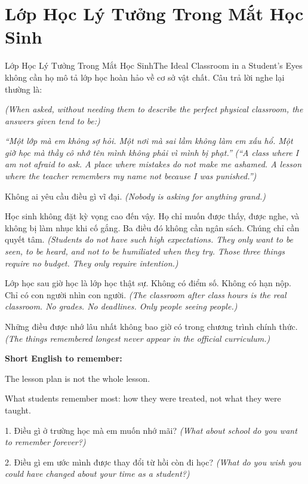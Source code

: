 \section{Lớp Học Lý Tưởng Trong Mắt Học Sinh}
\begin{truyen}{Lớp Học Lý Tưởng Trong Mắt Học Sinh}{The Ideal Classroom in a Student's Eyes}
 không cần họ mô tả lớp học hoàn hảo về cơ sở vật chất. Câu trả lời nghe lại thường là:

\textit{(When asked, without needing them to describe the perfect physical classroom, the answers given tend to be:)}

\textit{``Một lớp mà em không sợ hỏi. Một nơi mà sai lầm không làm em xấu hổ. Một giờ học mà thầy cô nhớ tên mình không phải vì mình bị phạt.''}
\textit{(``A class where I am not afraid to ask. A place where mistakes do not make me ashamed. A lesson where the teacher remembers my name not because I was punished.'')}

Không ai yêu cầu điều gì vĩ đại.
\textit{(Nobody is asking for anything grand.)}

\begin{baihoc}
Học sinh không đặt kỳ vọng cao đến vậy. Họ chỉ muốn được thấy, được nghe, và không bị làm nhục khi cố gắng. Ba điều đó không cần ngân sách. Chúng chỉ cần quyết tâm.
\textit{(Students do not have such high expectations. They only want to be seen, to be heard, and not to be humiliated when they try. Those three things require no budget. They only require intention.)}
\end{baihoc}
\end{truyen}

\begin{baihoc}
Lớp học sau giờ học là lớp học thật sự. Không có điểm số. Không có hạn nộp. Chỉ có con người nhìn con người.
\textit{(The classroom after class hours is the real classroom. No grades. No deadlines. Only people seeing people.)}

Những điều được nhớ lâu nhất không bao giờ có trong chương trình chính thức.
\textit{(The things remembered longest never appear in the official curriculum.)}
\end{baihoc}

\begin{ghinhoanh}
\textbf{Short English to remember:}

The lesson plan is not the whole lesson.

What students remember most: how they were treated, not what they were taught.
\end{ghinhoanh}

\begin{tuhocnhanh}
1. Điều gì ở trường học mà em muốn nhớ mãi? \textit{(What about school do you want to remember forever?)}

2. Điều gì em ước mình được thay đổi từ hồi còn đi học? \textit{(What do you wish you could have changed about your time as a student?)}
\end{tuhocnhanh}

\ngancach
